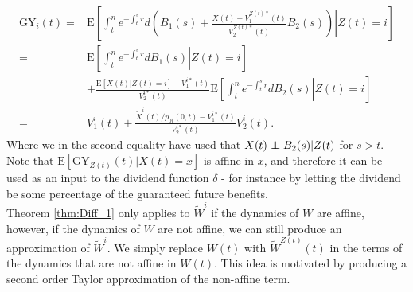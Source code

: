 \documentclass[12pt]{article}
\newcommand{\E}{\text{E}}
\newcommand{\indic}[1]{\mathds{1}_{ \{ #1 \} }}
\newcommand\independent{\protect\mathpalette{\protect\independenT}{\perp}}
\def\independenT#1#2{\mathrel{\rlap{$#1#2$}\mkern2mu{#1#2}}}
\theoremstyle{my_thm}
\begin{document}
\begin{align*}
\text{GY}_i(t)=&\E \left. \left[ \int_t^n e^{-\int_t^s r} d \left( B_1(s)+\frac{X(t)-V_1^{Z(t)*}(t)}{V_2^{Z(t)*}(t)}B_2(s) \right) \right| Z(t)=i\right]
\\
=&
\E \left[ \left. \int_t^n e^{-\int_t^s r} d B_1(s) \right| Z(t)=i \right]
\\
&+ \frac{\E[X(t)|Z(t)=i]-V_1^{i*}(t)}{V_2^{i*}(t)}  \E \left. \left[ \int_t^n e^{-\int_t^s r} dB_2(s) \right| Z(t)=i\right]
\\
=&
V_1^i(t)+\frac{\tilde{X}^{i}(t)/p_{0i}(0,t)-V_1^{i*}(t)}{V_2^{i*}(t)}V_2^i(t).
\end{align*}
Where we in the second equality have used that $X(t)\independent B_2(s)|Z(t)$ for $s>t$. Note that $\E[\text{GY}_{Z(t)}(t)|X(t)=x]$ is affine in $x$, and therefore it can be used as an input to the dividend function $\delta$ - for instance by letting the dividend be some percentage of the guaranteed future benefits.
\\[12pt]
Theorem \ref{thm:Diff_1} only applies to $\tilde{W}^i$ if the dynamics of $W$ are affine, however, if the dynamics of $W$ are not affine, we can still produce an approximation of $\tilde{W}^i$. We simply replace $W(t)$ with $\tilde{W}^{Z(t)}(t)$ in the terms of the dynamics that are not affine in $W(t)$. This idea is motivated by producing a second order Taylor approximation of the non-affine term.





\iffalse
We are interested in $\tilde{W}^i(t)$ for $i \in \mathcal{J}$, noting that the relation between $\tilde{W}^i$ and $\E_0[W(t)]$ is given by
\begin{align*}
\E_0[W(t)] =&
\sum_{i:i\in \mathcal{J}} \tilde{W}^i(t).
\end{align*}


We can even calculate the present value of all future benefits including bonus
\begin{align*}
\text{G}_i(t)=&\E \left[ \int_t^n e^{-\int_t^s r} d \left( B_1(s)+\frac{X(s)-V_1^{Z(s)*}(s)}{V_2^{Z(s)*}(s)}B_2(s) \right) \big|Z(t)=i \right]
\\
=&
\int_t^n e^{-\int_t^s r} \sum_{j:j \in \mathcal{J}} p_{ij}(t,s) \left( b_1^j(s)+ \sum_{k\neq j} \mu^{jk}(s) b^{jk}(s)  \right) ds
\\
&+
\int_t^n e^{-\int_t^s r} \sum_{j:j \in \mathcal{J}} p_{ij}(t,s) \frac{\E[X(s)|Z(s)=j,Z(t)=i]-V_1^{j*}(s)}{V_2^{j*}(s)}\left( b_1^j(s)+ \sum_{k\neq j} \mu^{jk}(s) b^{jk}(s)  \right) ds
\end{align*}
by using that $\E[X(s)|Z(s)=j,Z(t)=i]=\frac{\tilde{X}^j(s)}{p_{ij}(t,s)p{0i}(0,t)}$.
\fi
\end{document}
